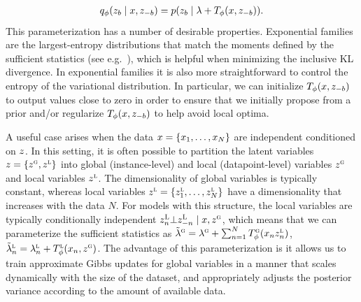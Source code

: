 \documentclass{article}
\theoremstyle{definition}
\begin{document}
\begin{align}
    q_\phi(z_b \mid x, z_{-b}) 
    = 
    p(z_b \mid \lambda + T_\phi(x, z_{-b}))
    .
\end{align}
This parameterization has a number of desirable properties. Exponential families are the largest-entropy distributions that match the moments defined by the sufficient statistics (see e.g.~\citet{wainwright2008graphical}), which is helpful when minimizing the inclusive KL divergence. In exponential families it is also more straightforward to control the entropy of the variational distribution. In particular, we can initialize $T_\phi(x, z_{-b})$ to output values close to zero in order to ensure that we initially propose from a prior and/or regularize $T_\phi(x, z_{-b})$ to help avoid local optima.

A useful case arises when the data $x = \{x_1, \ldots, x_N\}$ are independent conditioned on $z$. In this setting, it is often possible to partition the latent variables $z = \{z^\textsc{g}, z^\textsc{l}\}$ into global (instance-level) and local (datapoint-level) variables $z^{\textsc{g}}$ and local variables $z^{\textsc{l}}$. The dimensionality of global variables is typically constant, whereas local variables $z^\textsc{l} = \{z^\textsc{l}_1, \ldots, z^\textsc{l}_N\}$ have a dimensionality that increases with the data $N$. For models with this structure, the local variables are typically conditionally independent $z^\textsc{L}_n \bot z^\textsc{L}_{-n} \mid x, z^\textsc{g}$, which means that we can parameterize the sufficient statistics as $\tilde{\lambda}^\textsc{g}=\lambda^\textsc{g} + 
    \sum_{n=1}^N T^\textsc{g}_\phi(x_n z^\textsc{l}_{n})$, $\tilde{\lambda}^\textsc{l}_n=\lambda^\textsc{l}_n + T^\textsc{l}_\phi(x_n, z^\textsc{g})$.
The advantage of this parameterization is it allows us to train approximate Gibbs updates for global variables in a manner that scales dynamically with the size of the dataset, and appropriately adjusts the posterior variance according to the amount of available data.
\end{document}

